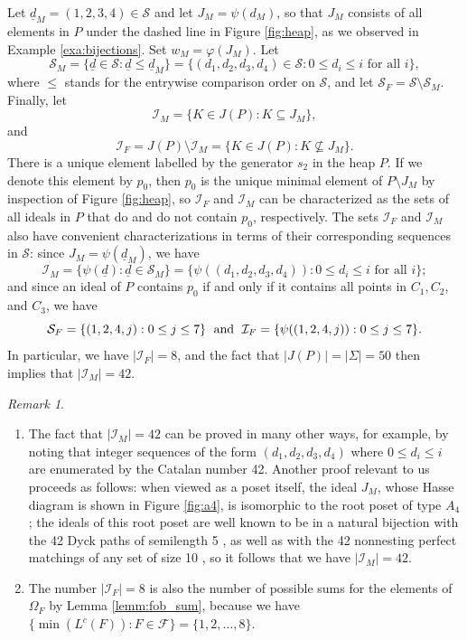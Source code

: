 \documentclass[11pt]{amsart}
\theoremstyle{plain}
\theoremstyle{definition}
\theoremstyle{remark}
\newtheorem{rmk}[theorem]{Remark}
\numberwithin{equation}{section}
\newcommand{\lc}{L^c}
\newcommand{\seqd}{\underline{d}}
\newcommand{\calf}{\mathcal{F}}
\newcommand{\cali}{\mathcal{I}}
\newcommand{\cals}{\mathcal{S}}
\newcommand{\fob}{\Omega_F}
\newcommand{\se}{\subseteq}
\newcommand{\abs}[1]{\lvert #1 \rvert}
\begin{document}
Let $\seqd_M=(1,2,3,4)\in \cals$ and let $J_M=\psi(d_M)$, so that $J_M$ consists
of all elements in $P$ under the dashed line in Figure \ref{fig:heap}, as
we observed in Example \ref{exa:bijections}. 
Set $w_M=\varphi(J_M)$.
Let 
\[
  \cals_M=\{\seqd\in \cals: \seqd\le \seqd_M\}=\{(d_1,d_2,d_3,d_4)\in \cals: 0\le d_i\le i
  \text{ for all } i\},
\]
where $\le$ stands for the entrywise comparison order on $\cals$, and let
$\cals_F=\cals\setminus\cals_M$. Finally, let 
 \[ \cali_M= \{K\in J(P): K\se J_M\},\] 
and  
\[
  \cali_F=J(P)\setminus\cali_M=\{K\in J(P): K\not\se J_M\}. 
\] 
There is a unique element labelled by the generator $s_2$ in the heap $P$. If we
denote this element by $p_0$, then $p_0$ is the unique minimal element of
$P\setminus J_M$ by inspection of Figure \ref{fig:heap}, so $\cali_F$ and
$\cali_M$ can be characterized as the sets of all ideals in $P$ that do and do
not contain $p_0$, respectively. The sets $\cali_F$ and $\cali_M$ also have
convenient characterizations in terms of their corresponding sequences in $\cals$:
since $J_M=\psi(\seqd_M)$, we have 
\begin{equation}
\label{eq:cali_M}
\cali_M=\{\psi(\seqd):\seqd\in \cals_M\}=\{\psi((d_1,d_2,d_3,d_4)): 0\le d_i\le i
  \text{ for all } i\};
\end{equation}
and since an ideal of $P$ contains $p_0$ if and only if
it contains all points in $C_1, C_2$, and $C_3$, we have 
\begin{equation}
\label{eq:cali_F}
\cals_F=\{(1,2,4,j):0\le j\le 7\} \text{\; and \;}
  \cali_F=\{\psi((1,2,4,j)): 0\le j\le 7\}.
\end{equation}
In particular, we have $\abs{\cali_F}=8$, and the fact that
$\abs{J(P)}=\abs{\Sigma}=50$ then implies that $\abs{\cali_M}=42$.  

\begin{rmk}
\label{rmk:42}
\begin{enumerate}
\item 
The fact that $\abs{\cali_M}=42$ can be proved in many other ways, for example,
by noting that integer sequences of the form $(d_1,d_2,d_3,d_4)$ where $0\le
d_i\le i$ are enumerated by the Catalan number 42. Another proof relevant to us
proceeds as follows: when viewed as a poset itself, the ideal $J_M$, whose Hasse
diagram is shown in Figure \ref{fig:a4}, is isomorphic to the root poset of type
$A_4$; the ideals of this root poset are well known to be in a natural bijection
with the 42 Dyck paths of semilength 5 \cite[Section 5.1.3]{ringel16}, as well
as with the 42 nonnesting perfect matchings of any set of size 10
\cite[Interpretation 64]{stanley15}, so it follows that we have
$\abs{\cali_M}=42$.  \item The number $\abs{\cali_F}=8$ is also the number of
possible sums for the elements of $\fob$ by Lemma \ref{lemm:fob_sum}, because we
have $\{\min(\lc(F)):F\in \calf\}=\{1,2,\dots, 8\}$. \end{enumerate} \end{rmk}
\end{document}
